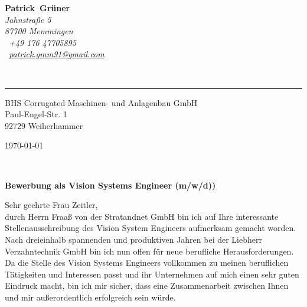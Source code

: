 \documentclass[10pt,a4paper]{article}
\def\firstname{Patrick}
\def\familyname{Grüner}
\begin{document}
\sffamily   %
\hfill%
\begin{minipage}[t]{.6\textwidth}
	\raggedleft%
	{\bfseries {\color{firstnamecolor}\firstname}~{\color{familynamecolor}\familyname}}\\[.35ex]
	\small\itshape%
	Jahnstraße 5\\
	87700 Memmingen\\[.35ex]
	\Mobilefone~+49 176 47705895\\
	\Letter~\href{mailto:patrick.gmm91@gmail.com}{patrick.gmm91@gmail.com}
\end{minipage}\\[0.5em]
%
{\color{firstnamecolor}\rule{\textwidth}{.25ex}}
%
\begin{minipage}[t]{.5\textwidth}
	\raggedright%
	\vspace*{1em}
	BHS Corrugated Maschinen- und Anlagenbau GmbH\\[.35ex]
	\small%
	Paul-Engel-Str. 1\\
	92729 Weiherhammer
\end{minipage}
%
\hfill
%
\begin{minipage}[t]{.4\textwidth}
	\raggedleft %
	\today
\end{minipage}\\[1em]
\raggedright

{\bfseries \color{familynamecolor}Bewerbung als Vision Systems Engineer (m/w/d))\\[1.5em]}

Sehr geehrte Frau Zeitler,\\[1em]
%
durch Herrn Fraaß von der Stratandnet GmbH bin ich auf Ihre interessante Stellenausschreibung des Vision System Engineers aufmerksam gemacht worden. Nach dreieinhalb spannenden und produktiven Jahren bei der Liebherr Verzahntechnik GmbH bin ich nun offen für neue berufliche Herausforderungen. Da die Stelle des Vision Systems Engineers vollkommen zu meinen beruflichen Tätigkeiten und Interessen passt und ihr Unternehmen auf mich einen sehr guten Eindruck macht, bin ich mir sicher, dass eine Zusammenarbeit zwischen Ihnen und mir außerordentlich erfolgreich sein würde.
\end{document}
